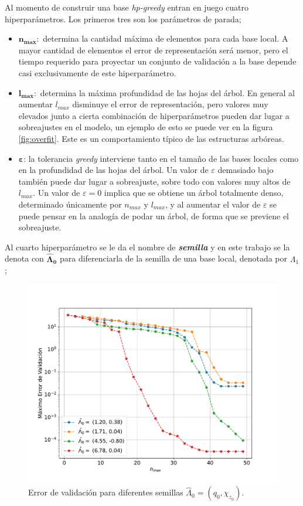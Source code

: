 Al momento de construir una base \textit{hp-greedy} entran en juego cuatro hiperparámetros. Los primeros tres son los parámetros de parada;
\begin{itemize}
\item $\bm{n_{max}}:$ determina la cantidad máxima de elementos para cada base local. A mayor cantidad de elementos el error de representación será menor, pero el tiempo requerido para proyectar un conjunto de validación a la base depende casi exclusivamente de este hiperparámetro.
\item $\bm{l_{max}}:$ determina la máxima profundidad de las hojas del árbol. En general al aumentar $l_{max}$ disminuye el error de representación, pero valores muy elevados junto a cierta combinación de hiperparámetros pueden dar lugar a sobreajustes en el modelo, un ejemplo de esto se puede ver en la figura \ref{fig:overfit}. Este es un comportamiento típico de las estructuras arbóreas.
\item $\bm{\varepsilon}$: la tolerancia \textit{greedy} interviene tanto en el tamaño de las bases locales como en la profundidad de las hojas del árbol. Un valor de $\varepsilon$ demasiado bajo también puede dar lugar a sobreajuste, sobre todo con valores muy altos de $l_{max}$. Un valor de $\varepsilon = 0$ implica que se obtiene un árbol totalmente denso, determinado únicamente por $n_{max}$ y $l_{max}$, y al aumentar el valor de $\varepsilon$ se puede pensar en la analogía de podar un árbol, de forma que se previene el sobreajuste.
\end{itemize}

Al cuarto hiperparámetro se le da el nombre de \textit{\textbf{semilla}} y en este trabajo se la denota con $\bm{\hat{\Lambda}_0}$ para diferenciarla de la semilla de una base local, denotada por $\Lambda_1$;

\begin{figure}[h!]
\centering
\includegraphics[width=.8\columnwidth ,trim={1.1cm, 1.1cm, 1.2cm, 1.2cm}]{figs/Semillas_v_nmax_2D.pdf}
\caption{Error de validación para diferentes semillas $\hat{\Lambda}_0 = (q_0, \chi_{z_0})$.}
\label{fig:seeds0}
\end{figure}

